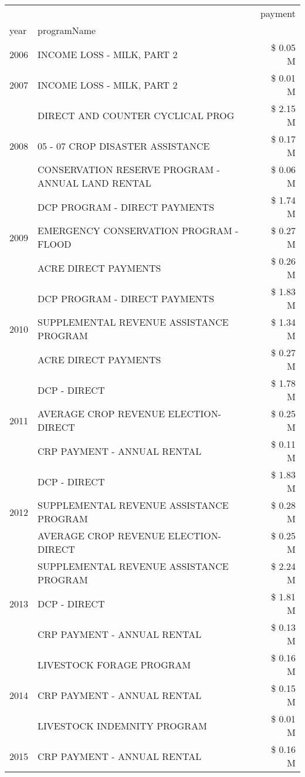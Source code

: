 \begin{tabular}{llr}
\toprule
 &  & payment \\
year & programName &  \\
\midrule
2006 & INCOME LOSS - MILK, PART 2 & \$ 0.05 M \\
\cline{1-3}
2007 & INCOME LOSS - MILK, PART 2 & \$ 0.01 M \\
\cline{1-3}
\multirow[t]{3}{*}{2008} & DIRECT AND COUNTER CYCLICAL PROG & \$ 2.15 M \\
 & 05 - 07 CROP DISASTER ASSISTANCE & \$ 0.17 M \\
 & CONSERVATION RESERVE PROGRAM - ANNUAL LAND RENTAL & \$ 0.06 M \\
\cline{1-3}
\multirow[t]{3}{*}{2009} & DCP PROGRAM - DIRECT PAYMENTS & \$ 1.74 M \\
 & EMERGENCY CONSERVATION PROGRAM - FLOOD & \$ 0.27 M \\
 & ACRE DIRECT PAYMENTS & \$ 0.26 M \\
\cline{1-3}
\multirow[t]{3}{*}{2010} & DCP PROGRAM - DIRECT PAYMENTS & \$ 1.83 M \\
 & SUPPLEMENTAL REVENUE ASSISTANCE PROGRAM & \$ 1.34 M \\
 & ACRE DIRECT PAYMENTS & \$ 0.27 M \\
\cline{1-3}
\multirow[t]{3}{*}{2011} & DCP - DIRECT & \$ 1.78 M \\
 & AVERAGE CROP REVENUE ELECTION-DIRECT & \$ 0.25 M \\
 & CRP PAYMENT - ANNUAL RENTAL & \$ 0.11 M \\
\cline{1-3}
\multirow[t]{3}{*}{2012} & DCP - DIRECT & \$ 1.83 M \\
 & SUPPLEMENTAL REVENUE ASSISTANCE PROGRAM & \$ 0.28 M \\
 & AVERAGE CROP REVENUE ELECTION-DIRECT & \$ 0.25 M \\
\cline{1-3}
\multirow[t]{3}{*}{2013} & SUPPLEMENTAL REVENUE ASSISTANCE PROGRAM & \$ 2.24 M \\
 & DCP - DIRECT & \$ 1.81 M \\
 & CRP PAYMENT - ANNUAL RENTAL & \$ 0.13 M \\
\cline{1-3}
\multirow[t]{3}{*}{2014} & LIVESTOCK FORAGE PROGRAM & \$ 0.16 M \\
 & CRP PAYMENT - ANNUAL RENTAL & \$ 0.15 M \\
 & LIVESTOCK INDEMNITY PROGRAM & \$ 0.01 M \\
\cline{1-3}
2015 & CRP PAYMENT - ANNUAL RENTAL & \$ 0.16 M \\
\cline{1-3}

\end{tabular}

